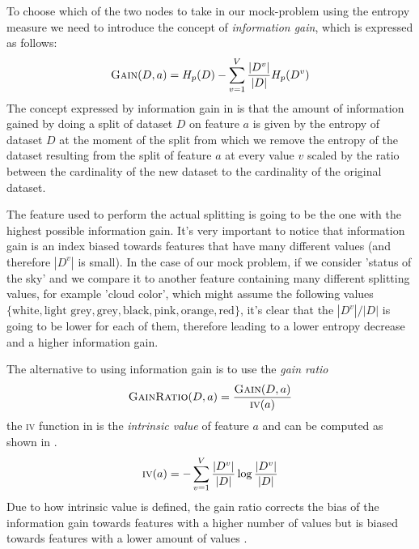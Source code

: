 \smallskip

To choose which of the two nodes to take in our mock-problem using the entropy measure we need to
introduce the concept of \emph{information gain}, which is expressed as follows:
\begin{equation}
	\label{eq:information-gain}
	\textsc{Gain}(D, a) = H_p(D) - \sum_{v = 1}^V\frac{|D^v|}{|D|}H_p(D^v)
\end{equation}
The concept expressed by information gain in  is that the amount of
information gained by doing a split of dataset $D$ on feature $a$ is given by the entropy of dataset
$D$ at the moment of the split from which we remove the entropy of the dataset resulting from the
split of feature $a$ at every value $v$ scaled by the ratio between the cardinality of the new dataset to
the cardinality of the original dataset.

\smallskip

The feature used to perform the actual splitting is going to be the one with the highest possible
information gain. It's very important to notice that information gain is an index biased towards
features that have many different values (and therefore $|D^v|$ is small). In the case of our mock
problem, if we consider 'status of the sky' and we compare it to another feature containing many
different splitting values, for example 'cloud color', which might assume the following values
$\{\text{white}, \text{light grey}, \text{grey}, \text{black}, \text{pink}, \text{orange},
	\text{red}\}$, it's clear that the $|D^v|/|D|$ is going to be lower for each of them, therefore
leading to a lower entropy decrease and a higher information gain.

\medskip

The alternative to using information gain is to use the \emph{gain ratio}
\begin{equation}
	\label{eq:gain-ratio}
	\textsc{GainRatio}(D, a) = \frac{\textsc{Gain}(D, a)}{\textsc{iv}(a)}
\end{equation}
the \textsc{iv} function in  is the \emph{intrinsic value} of feature $a$ and
can be computed as shown in .
\begin{equation}
	\label{eq:intrinsic-value}
	\textsc{iv}(a) = - \sum_{v = 1}^V\frac{|D^v|}{|D|} \log{\frac{|D^v|}{|D|}}
\end{equation}
Due to how intrinsic value is defined, the gain ratio corrects the bias of the information gain towards features
with a higher number of values but is biased towards features with a lower amount of values
\cite{ZhouZhi-Hua2021ML}.

